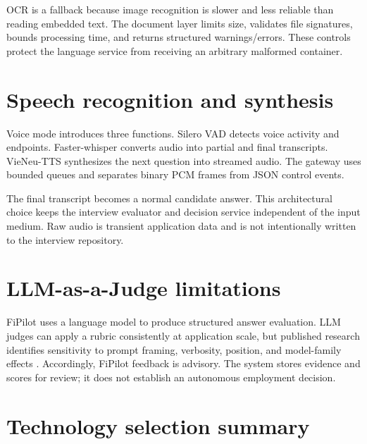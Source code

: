 OCR is a fallback because image recognition is slower and less reliable than reading embedded text. The document layer limits size, validates file signatures, bounds processing time, and returns structured warnings/errors. These controls protect the language service from receiving an arbitrary malformed container.

\section{Speech recognition and synthesis}

Voice mode introduces three functions. Silero VAD detects voice activity and endpoints. Faster-whisper converts audio into partial and final transcripts. VieNeu-TTS synthesizes the next question into streamed audio. The gateway uses bounded queues and separates binary PCM frames from JSON control events.

The final transcript becomes a normal candidate answer. This architectural choice keeps the interview evaluator and decision service independent of the input medium. Raw audio is transient application data and is not intentionally written to the interview repository.

\section{LLM-as-a-Judge limitations}

FiPilot uses a language model to produce structured answer evaluation. LLM judges can apply a rubric consistently at application scale, but published research identifies sensitivity to prompt framing, verbosity, position, and model-family effects \cite{zheng2023judge}. Accordingly, FiPilot feedback is advisory. The system stores evidence and scores for review; it does not establish an autonomous employment decision.

\section{Technology selection summary}


